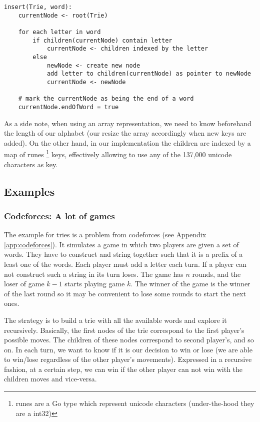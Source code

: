 \documentclass[a4paper,10pt,table,xcdraw]{article}
\begin{document}
\begin{verbatim}
insert(Trie, word):
    currentNode <- root(Trie)
    
    for each letter in word
        if children(currentNode) contain letter
            currentNode <- children indexed by the letter
        else 
            newNode <- create new node
            add letter to children(currentNode) as pointer to newNode
            currentNode <- newNode
            
    # mark the currentNode as being the end of a word
	currentNode.endOfWord = true

\end{verbatim}


As a side note, when using an array representation, we need to know beforehand the length of our alphabet (our resize the array accordingly when new keys are added). On the other hand, in our implementation the children are indexed by a map of runes \footnote{ runes are a Go type which represent unicode characters (under-the-hood they are a int32)} keys, effectively allowing to use any of the 137,000 unicode characters as key.

\subsection{Examples}

\subsubsection{Codeforces: A lot of games}
\label{subsubsec:trie-examples} 

The example for tries is a problem from codeforces (see Appendix \ref{app:codeforces}). It simulates a game in which two players are given a set of words. They have to construct and string together such that it is a prefix of a least one of the words. Each player must add a letter each turn. If a player can not construct such a string in its turn loses. The game has $n$ rounds, and the loser of game $k-1$ starts playing game $k$. The winner of the game is the winner of the last round so it may be convenient to lose some rounds to start the next ones. 

The strategy is to build a trie with all the available words and explore it recursively. Basically, the first nodes of the trie correspond to the first player's possible moves. The children of these nodes correspond to second player's, and so on. In each turn, we want to know if it is our decision to win or lose (we are able to win/lose regardless of the other player's movements). Expressed in a recursive fashion, at a certain step, we can win if the other player can not win with the children moves and vice-versa.
\end{document}
